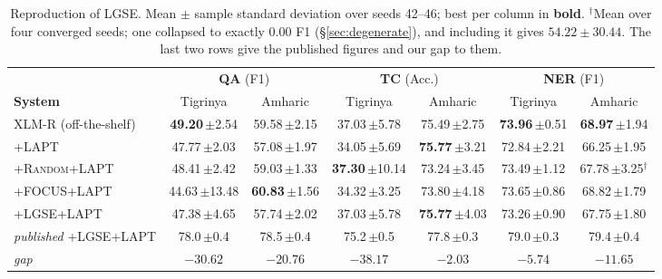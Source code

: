 \documentclass[11pt]{article}
\begin{document}
\begin{table}[t]
\centering
\small
\begin{tabular}{llcccccc}
\toprule
& & \multicolumn{2}{c}{\textbf{QA} (F1)} & \multicolumn{2}{c}{\textbf{TC} (Acc.)} & \multicolumn{2}{c}{\textbf{NER} (F1)} \\
\cmidrule(lr){3-4}\cmidrule(lr){5-6}\cmidrule(lr){7-8}
\textbf{System} & & Tigrinya & Amharic & Tigrinya & Amharic & Tigrinya & Amharic \\
\midrule
XLM-R (off-the-shelf) & & \textbf{49.20}\,\small{$\pm$2.54} & 59.58\,\small{$\pm$2.15} & 37.03\,\small{$\pm$5.78} & 75.49\,\small{$\pm$2.75} & \textbf{73.96}\,\small{$\pm$0.51} & \textbf{68.97}\,\small{$\pm$1.94} \\
\textsc{+LAPT} & & 47.77\,\small{$\pm$2.03} & 57.08\,\small{$\pm$1.97} & 34.05\,\small{$\pm$5.69} & \textbf{75.77}\,\small{$\pm$3.21} & 72.84\,\small{$\pm$2.21} & 66.25\,\small{$\pm$1.95} \\
\textsc{+Random+LAPT} & & 48.41\,\small{$\pm$2.42} & 59.03\,\small{$\pm$1.33} & \textbf{37.30}\,\small{$\pm$10.14} & 73.24\,\small{$\pm$3.45} & 73.49\,\small{$\pm$1.12} & 67.78\,\small{$\pm$3.25}$^\dagger$ \\
\textsc{+FOCUS+LAPT} & & 44.63\,\small{$\pm$13.48} & \textbf{60.83}\,\small{$\pm$1.56} & 34.32\,\small{$\pm$3.25} & 73.80\,\small{$\pm$4.18} & 73.65\,\small{$\pm$0.86} & 68.82\,\small{$\pm$1.79} \\
\textsc{+LGSE+LAPT} & & 47.38\,\small{$\pm$4.65} & 57.74\,\small{$\pm$2.02} & 37.03\,\small{$\pm$5.78} & \textbf{75.77}\,\small{$\pm$4.03} & 73.26\,\small{$\pm$0.90} & 67.75\,\small{$\pm$1.80} \\
\midrule
\multicolumn{2}{l}{\textit{published} \textsc{+LGSE+LAPT}} & 78.0\,\small{$\pm$0.4} & 78.5\,\small{$\pm$0.4} & 75.2\,\small{$\pm$0.5} & 77.8\,\small{$\pm$0.3} & 79.0\,\small{$\pm$0.3} & 79.4\,\small{$\pm$0.4} \\
\multicolumn{2}{l}{\textit{gap}} & $-30.62$ & $-20.76$ & $-38.17$ & $-2.03$ & $-5.74$ & $-11.65$ \\
\bottomrule
\end{tabular}
\caption{Reproduction of LGSE. Mean $\pm$ sample standard deviation over
seeds 42--46; best per column in \textbf{bold}. $^\dagger$Mean over four
converged seeds; one collapsed to exactly 0.00 F1 (\S\ref{sec:degenerate}),
and including it gives $54.22 \pm 30.44$. The last two rows give the
published figures and our gap to them.}
\label{tab:main}
\end{table}
\end{document}
